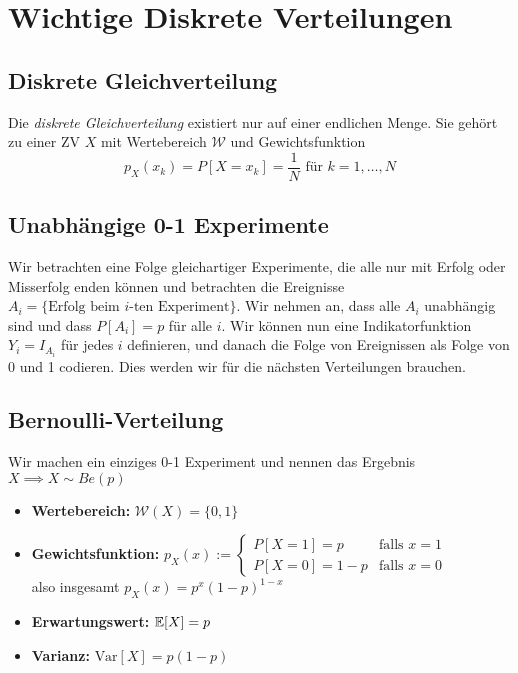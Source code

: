 \section{Wichtige Diskrete Verteilungen}

\subsection{Diskrete Gleichverteilung}
Die \textit{diskrete Gleichverteilung} existiert nur auf einer endlichen Menge. Sie gehört zu einer ZV $X$ mit Wertebereich $\mathcal{W}$ und Gewichtsfunktion 
$$p_X(x_k) = P[X=x_k]=\frac{1}{N} \mbox{   für } k=1,\dots, N$$

\subsection{Unabhängige 0-1 Experimente}
Wir betrachten eine Folge gleichartiger Experimente, die alle nur mit Erfolg oder Misserfolg enden können und betrachten die Ereignisse $A_i = \{\mbox{Erfolg beim }i\mbox{-ten Experiment}\}$. Wir nehmen an, dass alle $A_i$ unabhängig sind und dass $P[A_i]=p$ für alle $i$. Wir können nun eine Indikatorfunktion $Y_i = I_{A_i}$ für jedes $i$ definieren, und danach die Folge von Ereignissen als Folge von 0 und 1 codieren. Dies werden wir für die nächsten Verteilungen brauchen.

\subsection{Bernoulli-Verteilung}
Wir machen ein einziges 0-1 Experiment und nennen das Ergebnis $X \implies X \sim Be(p)$ 
\begin{itemize}
\item \textbf{Wertebereich:} $\mathcal{W}(X) = \{0,1\}$
\item \textbf{Gewichtsfunktion:} $p_X(x) := \begin{cases} P[X=1]=p & \mbox{falls } x=1 \\ P[X=0]=1-p & \mbox{falls } x=0 \end{cases}\quad \quad \quad$ also insgesamt $p_X(x)= p^x(1-p)^{1-x}$
\item \textbf{Erwartungswert:} $\mathbb{E}[X]=p \quad \quad \quad$
\item \textbf{Varianz:} $\mbox{Var}[X] = p(1-p)$
\end{itemize}

